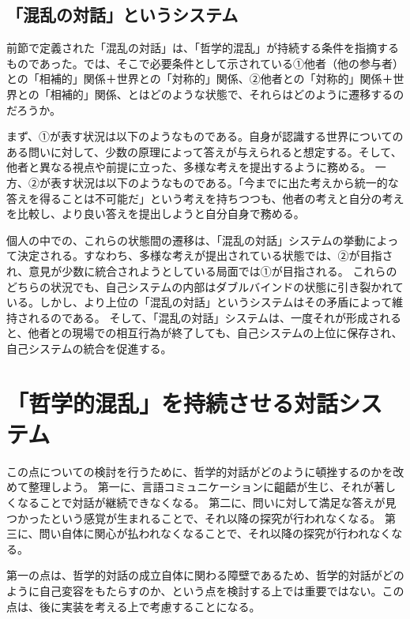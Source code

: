 \documentclass[b5j,twoside,twocolumn]{utarticle}
\begin{document}
\subsection{「混乱の対話」というシステム}
前節で定義された「混乱の対話」は、「哲学的混乱」が持続する条件を指摘するものであった。では、そこで必要条件として示されている①他者（他の参与者）との「相補的」関係＋世界との「対称的」関係、②他者との「対称的」関係＋世界との「相補的」関係、とはどのような状態で、それらはどのように遷移するのだろうか。


まず、①が表す状況は以下のようなものである。自身が認識する世界についてのある問いに対して、少数の原理によって答えが与えられると想定する。そして、他者と異なる視点や前提に立った、多様な考えを提出するように務める。
一方、②が表す状況は以下のようなものである。「今までに出た考えから統一的な答えを得ることは不可能だ」という考えを持ちつつも、他者の考えと自分の考えを比較し、より良い答えを提出しようと自分自身で務める。


個人の中での、これらの状態間の遷移は、「混乱の対話」システムの挙動によって決定される。すなわち、多様な考えが提出されている状態では、②が目指され、意見が少数に統合されようとしている局面では①が目指される。
これらのどちらの状況でも、自己システムの内部はダブルバインドの状態に引き裂かれている。しかし、より上位の「混乱の対話」というシステムはその矛盾によって維持されるのである。
そして、「混乱の対話」システムは、一度それが形成されると、他者との現場での相互行為が終了しても、自己システムの上位に保存され、自己システムの統合を促進する。



\section{「哲学的混乱」を持続させる対話システム}






この点についての検討を行うために、哲学的対話がどのように頓挫するのかを改めて整理しよう。
第一に、言語コミュニケーションに齟齬が生じ、それが著しくなることで対話が継続できなくなる。
第二に、問いに対して満足な答えが見つかったという感覚が生まれることで、それ以降の探究が行われなくなる。
第三に、問い自体に関心が払われなくなることで、それ以降の探究が行われなくなる。


第一の点は、哲学的対話の成立自体に関わる障壁であるため、哲学的対話がどのように自己変容をもたらすのか、という点を検討する上では重要ではない。この点は、後に実装を考える上で考慮することになる。
\end{document}
